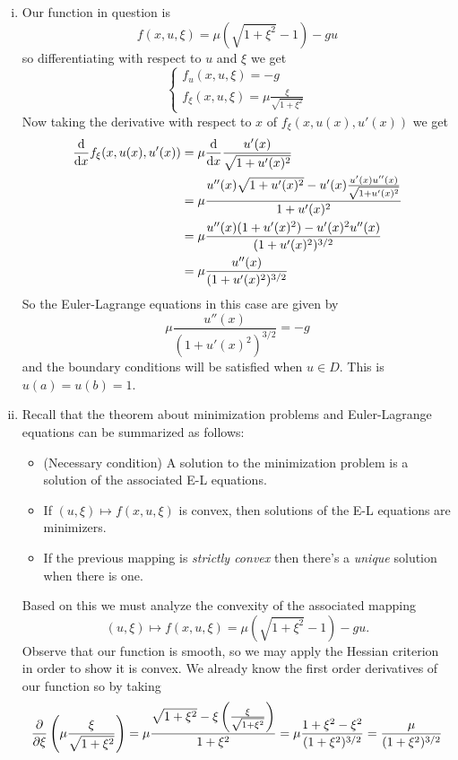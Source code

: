 \documentclass[12pt]{memoir}
\begin{document}
\begin{ptcbr}
    \begin{enumerate}[i)]
        \item Our function in question is 
        $$f(x,u,\xi)=\mu\left(\sqrt{1+\xi^2}-1\right)-gu$$
        so differentiating with respect to $u$ and $\xi$ we get 
        $$
        \begin{cases}
            f_u(x,u,\xi)=-g\\
            f_\xi(x,u,\xi)=\mu\frac{\xi}{\sqrt{1+\xi^2}}
        \end{cases}
        $$
        Now taking the derivative with respect to $x$ of $f_{\xi}(x,u(x),u'(x))$ we get 
        \begin{align*}
            \dv{x}f_{\xi}(x,u(x),u'(x))&=\mu\dv{x}\frac{u'(x)}{\sqrt{1+u'(x)^2}}\\
            &=\mu\frac{u''(x)\sqrt{1+u'(x)^2}-u'(x)\frac{u'(x)u''(x)}{\sqrt{1+u'(x)^2}}}{1+u'(x)^2}\\
            &=\mu\frac{u''(x)(1+u'(x)^2)-u'(x)^2u''(x)}{(1+u'(x)^2)^{3/2}}\\
            &=\mu\frac{u''(x)}{(1+u'(x)^2)^{3/2}}
        \end{align*}
    So the Euler-Lagrange equations in this case are given by
    $$\mu\frac{u''(x)}{(1+u'(x)^2)^{3/2}}=-g$$
    and the boundary conditions will be satisfied when $u\in D$. This is $u(a)=u(b)=1$. %
    \item Recall that the theorem about minimization problems and Euler-Lagrange equations can be summarized as follows:
    \begin{itemize}
        \item (Necessary condition) A solution to the minimization problem is a solution of the associated E-L equations.
        \item If $(u,\xi)\mapsto f(x,u,\xi)$ is convex, then solutions of the E-L equations are minimizers.
        \item If the previous mapping is \emph{strictly convex} then there's a \emph{unique} solution when there is one.
    \end{itemize}
    Based on this we must analyze the convexity of the associated mapping
    $$(u,\xi)\mapsto f(x,u,\xi)=\mu\left(\sqrt{1+\xi^2}-1\right)-gu.$$
    Observe that our function is smooth, so we may apply the Hessian criterion in order to show it is convex. We already know the first order derivatives of our function so by taking 
    $$\pdv{\xi}\left(\mu\frac{\xi}{\sqrt{1+\xi^2}}\right)=\mu\frac{\sqrt{1+\xi^2}-\xi\left(\frac{\xi}{\sqrt{1+\xi^2}}\right)}{1+\xi^2}=\mu\frac{1+\xi^2-\xi^2}{(1+\xi^2)^{3/2}}=\frac{\mu}{(1+\xi^2)^{3/2}}$$

\end{enumerate}
\end{ptcbr}
\end{document}
